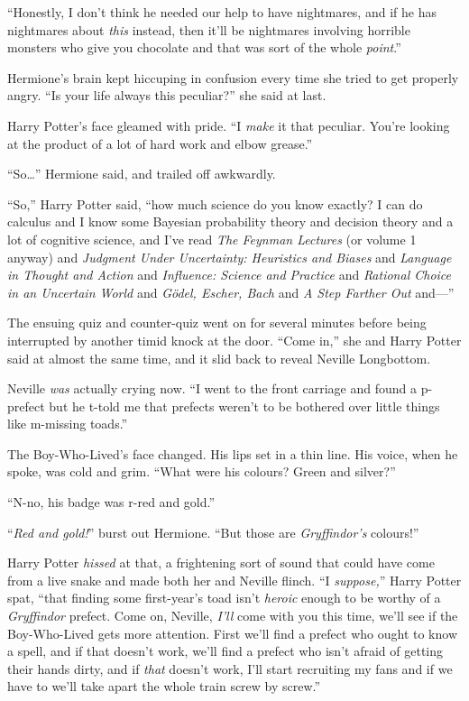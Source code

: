“Honestly, I don’t think he needed our help to have nightmares, and if he has nightmares about \emph{this} instead, then it’ll be nightmares involving horrible monsters who give you chocolate and that was sort of the whole \emph{point}.”

Hermione’s brain kept hiccuping in confusion every time she tried to get properly angry. “Is your life always this peculiar?” she said at last.

Harry Potter’s face gleamed with pride. “I \emph{make} it that peculiar. You’re looking at the product of a lot of hard work and elbow grease.”

“So…” Hermione said, and trailed off awkwardly.

“So,” Harry Potter said, “how much science do you know exactly? I can do calculus and I know some Bayesian probability theory and decision theory and a lot of cognitive science, and I’ve read \emph{The Feynman Lectures} (or volume 1 anyway) and \emph{Judgment Under Uncertainty: Heuristics and Biases} and \emph{Language in Thought and Action} and \emph{Influence: Science and Practice} and \emph{Rational Choice in an Uncertain World} and \emph{Gödel, Escher, Bach} and \emph{A Step Farther Out} and—”

The ensuing quiz and counter-quiz went on for several minutes before being interrupted by another timid knock at the door. “Come in,” she and Harry Potter said at almost the same time, and it slid back to reveal Neville Longbottom.

Neville \emph{was} actually crying now. “I went to the front carriage and found a p-prefect but he t-told me that prefects weren’t to be bothered over little things like m-missing toads.”

The Boy-Who-Lived’s face changed. His lips set in a thin line. His voice, when he spoke, was cold and grim. “What were his colours? Green and silver?”

“N-no, his badge was r-red and gold.”

“\emph{Red and gold!}” burst out Hermione. “But those are \emph{Gryffindor’s} colours!”

Harry Potter \emph{hissed} at that, a frightening sort of sound that could have come from a live snake and made both her and Neville flinch. “I \emph{suppose,}” Harry Potter spat, “that finding some first-year’s toad isn’t \emph{heroic} enough to be worthy of a \emph{Gryffindor} prefect. Come on, Neville, \emph{I’ll} come with you this time, we’ll see if the Boy-Who-Lived gets more attention. First we’ll find a prefect who ought to know a spell, and if that doesn’t work, we’ll find a prefect who isn’t afraid of getting their hands dirty, and if \emph{that} doesn’t work, I’ll start recruiting my fans and if we have to we’ll take apart the whole train screw by screw.”

